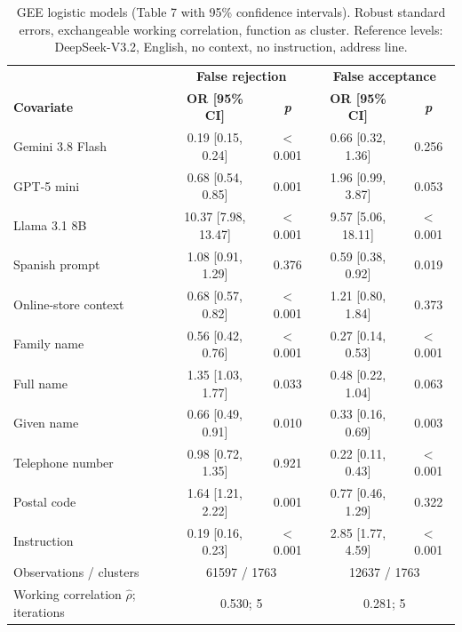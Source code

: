 \begin{table}[H]
\caption{GEE logistic models (Table 7 with 95\% confidence intervals). Robust standard errors, exchangeable working correlation, function as cluster. Reference levels: DeepSeek-V3.2, English, no context, no instruction, address line.\label{tab:gee}}
\begin{tabularx}{\textwidth}{Xcccc}
\toprule
& \multicolumn{2}{c}{\textbf{False rejection}} & \multicolumn{2}{c}{\textbf{False acceptance}}\\
\textbf{Covariate} & \textbf{OR [95\% CI]} & \textbf{\emph{p}} & \textbf{OR [95\% CI]} & \textbf{\emph{p}}\\
\midrule
Gemini 3.8 Flash & 0.19 [0.15, 0.24] & $<$0.001 & 0.66 [0.32, 1.36] & 0.256\\
GPT-5 mini & 0.68 [0.54, 0.85] & 0.001 & 1.96 [0.99, 3.87] & 0.053\\
Llama 3.1 8B & 10.37 [7.98, 13.47] & $<$0.001 & 9.57 [5.06, 18.11] & $<$0.001\\
Spanish prompt & 1.08 [0.91, 1.29] & 0.376 & 0.59 [0.38, 0.92] & 0.019\\
Online-store context & 0.68 [0.57, 0.82] & $<$0.001 & 1.21 [0.80, 1.84] & 0.373\\
Family name & 0.56 [0.42, 0.76] & $<$0.001 & 0.27 [0.14, 0.53] & $<$0.001\\
Full name & 1.35 [1.03, 1.77] & 0.033 & 0.48 [0.22, 1.04] & 0.063\\
Given name & 0.66 [0.49, 0.91] & 0.010 & 0.33 [0.16, 0.69] & 0.003\\
Telephone number & 0.98 [0.72, 1.35] & 0.921 & 0.22 [0.11, 0.43] & $<$0.001\\
Postal code & 1.64 [1.21, 2.22] & 0.001 & 0.77 [0.46, 1.29] & 0.322\\
Instruction & 0.19 [0.16, 0.23] & $<$0.001 & 2.85 [1.77, 4.59] & $<$0.001\\
\midrule
Observations / clusters & \multicolumn{2}{c}{61597 / 1763} & \multicolumn{2}{c}{12637 / 1763}\\
Working correlation $\hat\rho$; iterations & \multicolumn{2}{c}{0.530; 5} & \multicolumn{2}{c}{0.281; 5}\\
\bottomrule
\end{tabularx}
\end{table}

